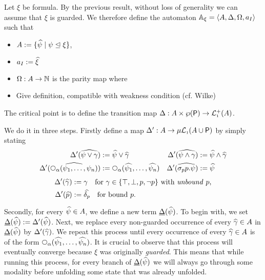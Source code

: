 Let $\xi$ be formula. By the previous result, without loss of generality we can assume that $\xi$ is guarded. 
We therefore define the automaton $\mathbb{A}_{\xi}=\langle{A,\Delta,\Omega,a_I}\rangle$ such that 

\begin{itemize}
\item $A:=\{ \widehat{\psi} \mid \psi  \trianglelefteq \xi\}$,
\item $a_I:= \widehat{\xi}$
\item $\Omega: A \to \mathbb{N}$ is the parity map where 
\btbs
\item
Give definition, compatible with weakness condition (cf. Wilke)
\etbs
\end{itemize}
The critical point is to define the transition map $\Delta: A\times \wp(\mathsf{P}) \to \mathcal{L}_{\scriptscriptstyle 1}^+(A)$.

We do it in three steps.
Firstly define a map $\Delta': A \to \mu\mathcal{L}_{\scriptscriptstyle 1}(A \cup  \mathsf{P})$ by simply stating
\begin{align*}
		\tmap'(\fsub{\psi \lor \gamma}) &:= \fsub{\psi} \lor \fsub{\gamma} &
		\tmap'(\fsub{\psi \land \gamma}) &:= \fsub{\psi} \land \fsub{\gamma} \\
		\tmap'(\fsub{\nxt{\al}(\psi_{1},\ldots,\psi_{n})}) &:= \nxt{\al}(\fsub{\psi_{1}},\ldots,\fsub{\psi_{n}}) &
		\tmap'(\fsub{\somefp_p p.\psi}) &:= \fsub{\psi}
	\end{align*}
	\vspace{-2mm}
	\begin{align*}	
		\tmap'(\fsub{\gamma}) &:= \gamma \quad \text{for $\gamma \in \{\top,\bot,p,\lnot p\}$ with \emph{unbound} $p$,} \\
		\tmap'(\fsub{p}) &:= \fsub{\delta_p} \quad \text{for bound $p$.}
	\end{align*}
	
Secondly, for every $\widehat{\psi}\in A$, we define a new term $\underline{\Delta}(\widehat{\psi})$. To begin with, we set $\underline{\Delta}(\widehat{\psi}) := \Delta'(\widehat{\psi})$. Next, we replace every non-guarded occurrence of every $\widehat{\gamma}\in A$ in $\underline{\Delta}(\widehat{\psi})$ by $\Delta'(\widehat{\gamma})$. We repeat this process until every occurrence of every $\widehat{\gamma} \in A$ is of the form $\nxt{\al}(\fsub{\psi_{1}},\ldots,\fsub{\psi_{n}})$. It is crucial to observe that this process will eventually converge because $\xi$ was originally \emph{guarded}. This means that while running this process, for every branch of $\underline{\Delta}(\widehat{\psi})$ we will always go through some modality before unfolding some state that was already unfolded.

